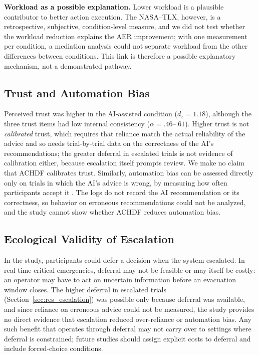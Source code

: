 \documentclass[journal]{IEEEtran}
\theoremstyle{plain}
\theoremstyle{definition}
\begin{document}
\textbf{Workload as a possible explanation.} Lower workload is a plausible contributor to better action execution. The NASA--TLX, however, is a retrospective, subjective, condition-level measure, and we did not test whether the workload reduction explains the AER improvement; with one measurement per condition, a mediation analysis could not separate workload from the other differences between conditions. This link is therefore a possible explanatory mechanism, not a demonstrated pathway.

\subsection{Trust and Automation Bias}
Perceived trust was higher in the AI-assisted condition ($d_z=1.18$), although the three trust items had low internal consistency ($\alpha = .46$--$.61$). Higher trust is not \emph{calibrated} trust, which requires that reliance match the actual reliability of the advice \cite{Lee2004} and so needs trial-by-trial data on the correctness of the AI's recommendations; the greater deferral in escalated trials is not evidence of calibration either, because escalation itself prompts review. We make no claim that ACHDF calibrates trust. Similarly, automation bias can be assessed directly only on trials in which the AI's advice is wrong, by measuring how often participants accept it \cite{Parasuraman2010}. The logs do not record the AI recommendation or its correctness, so behavior on erroneous recommendations could not be analyzed, and the study cannot show whether ACHDF reduces automation bias.

\subsection{Ecological Validity of Escalation}
In the study, participants could defer a decision when the system escalated. In real time-critical emergencies, deferral may not be feasible or may itself be costly: an operator may have to act on uncertain information before an evacuation window closes. The higher deferral in escalated trials (Section~\ref{sec:res_escalation}) was possible only because deferral was available, and since reliance on erroneous advice could not be measured, the study provides no direct evidence that escalation reduced over-reliance or automation bias. Any such benefit that operates through deferral may not carry over to settings where deferral is constrained; future studies should assign explicit costs to deferral and include forced-choice conditions.
\end{document}
